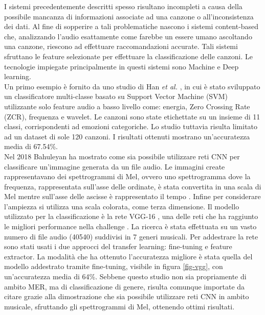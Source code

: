 \documentclass[11pt]{report}
\begin{document}
I sistemi precedentemente descritti spesso risultano incompleti a causa della possibile mancanza di informazioni associate ad una canzone o all'inconsistenza dei dati. Al fine di sopperire a tali problematiche nascono i sistemi content-based che, analizzando l'audio esattamente come farebbe un essere umano ascoltando una canzone, riescono ad effettuare raccomandazioni accurate. Tali sistemi sfruttano le feature selezionate per effettuare la classificazione delle canzoni. Le tecnologie impiegate principalmente in questi sistemi sono Machine e Deep learning. \\

Un primo esempio è fornito da uno studio di Han \textit{et al.} \cite{han2010music}, in cui è stato sviluppato un classificatore multi-classe basato su Support Vector Machine (SVM) utilizzante solo feature audio a basso livello come: energia, Zero Crossing Rate (ZCR), frequenza e wavelet. Le canzoni sono state etichettate su un insieme di 11 classi, corrispondenti ad emozioni categoriche. Lo studio tuttavia risulta limitato ad un dataset di sole 120 canzoni. I risultati ottenuti mostrano un'accuratezza media di 67.54\%.\\

Nel 2018 Bahuleyan \cite{bahuleyan2018music} ha mostrato come sia possibile utilizzare reti CNN per classificare un'immagine generata da un file audio. Le immagini create rappresentavano dei spettrogrammi di Mel, ovvero uno spettrogramma dove la frequenza, rappresentata sull'asse delle ordinate, è stata convertita in una scala di Mel mentre sull'asse delle ascisse è rappresentato il tempo \cite{roberts2022}. Infine per considerare l'ampiezza si utilizza una scala colorata, come terza dimensione. Il modello utilizzato per la classificazione è la rete VGG-16 \cite{simonyan2014very}, una delle reti che ha raggiunto le migliori performance nella challenge . La ricerca è stata effettuata su un vasto numero di file audio (40540) suddivisi in 7 generi musicali. Per addestrare la rete sono stati usati i due approcci del transfer learning: fine-tuning e feature extractor. La modalità che ha ottenuto l'accuratezza migliore è stata quella del modello addestrato tramite fine-tuning, visibile in figura \ref{fig-vgg}, con un'accuratezza media di 64\%. Sebbene questo studio non sia propriamente di ambito MER, ma di classificazione di genere, risulta comunque importate da citare grazie alla dimostrazione che sia possibile utilizzare reti CNN in ambito musicale, sfruttando gli spettrogrammi di Mel, ottenendo ottimi risultati.\\
\end{document}
